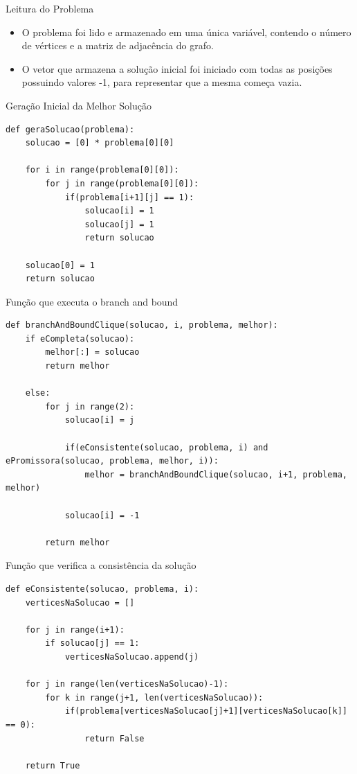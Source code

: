 \documentclass[compress,aspectratio=169]{beamer}
\begin{document}
    \begin{frame}{Leitura do Problema}
        \begin{itemize}
            \item O problema foi lido e armazenado em uma única variável, contendo o número de vértices e a matriz de adjacência do grafo.
            \item O vetor que armazena a solução inicial foi iniciado com todas as posições possuindo valores -1, para representar que a mesma começa vazia.
        \end{itemize}
    \end{frame}

    \begin{frame}[fragile]{Geração Inicial da Melhor Solução}
        \begin{lstlisting}
def geraSolucao(problema):
    solucao = [0] * problema[0][0]

    for i in range(problema[0][0]):
        for j in range(problema[0][0]):
            if(problema[i+1][j] == 1):
                solucao[i] = 1
                solucao[j] = 1
                return solucao

    solucao[0] = 1
    return solucao
        \end{lstlisting}
    \end{frame}
    
    \begin{frame}[fragile]{Função que executa o branch and bound}
        \begin{lstlisting}
def branchAndBoundClique(solucao, i, problema, melhor):
    if eCompleta(solucao):
        melhor[:] = solucao
        return melhor
    
    else:
        for j in range(2):
            solucao[i] = j
            
            if(eConsistente(solucao, problema, i) and ePromissora(solucao, problema, melhor, i)):
                melhor = branchAndBoundClique(solucao, i+1, problema, melhor)
            
            solucao[i] = -1
        
        return melhor
        \end{lstlisting}
    \end{frame}

    \begin{frame}[fragile]{Função que verifica a consistência da solução}
        \begin{lstlisting}
def eConsistente(solucao, problema, i):
    verticesNaSolucao = []
    
    for j in range(i+1):
        if solucao[j] == 1:
            verticesNaSolucao.append(j)

    for j in range(len(verticesNaSolucao)-1):
        for k in range(j+1, len(verticesNaSolucao)):
            if(problema[verticesNaSolucao[j]+1][verticesNaSolucao[k]] == 0):
                return False
            
    return True 
        \end{lstlisting}
    \end{frame}
\end{document}
